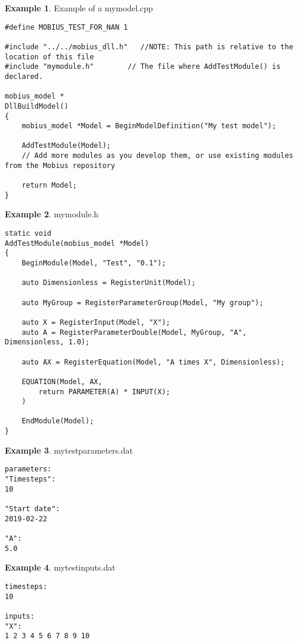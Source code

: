\documentclass[11pt]{article}
\theoremstyle{definition}
\newtheorem{myexample}{Example}
\newenvironment{example}%
  {\begin{lrbox}{\examplebox}%
   \begin{minipage}{\dimexpr\linewidth-2\fboxsep}
   \begin{myexample}}%
  {\end{myexample}%
   \end{minipage}%
   \end{lrbox}%
   \begin{trivlist}
     \item[]\colorbox{silver}{\usebox\examplebox}
   \end{trivlist}}
\begin{document}
\begin{example}\label{ex:examplemain}
Example of a mymodel.cpp
\begin{lstlisting}[style=mycpp]
#define MOBIUS_TEST_FOR_NAN 1

#include "../../mobius_dll.h"   //NOTE: This path is relative to the location of this file
#include "mymodule.h"        // The file where AddTestModule() is declared.

mobius_model *
DllBuildModel()
{
	mobius_model *Model = BeginModelDefinition("My test model");
	
	AddTestModule(Model);
	// Add more modules as you develop them, or use existing modules from the Mobius repository
	
	return Model;
}

\end{lstlisting}
\end{example}

\begin{example}
mymodule.h
\begin{lstlisting}[style=mycpp]
static void
AddTestModule(mobius_model *Model)
{
	BeginModule(Model, "Test", "0.1");

	auto Dimensionless = RegisterUnit(Model);

	auto MyGroup = RegisterParameterGroup(Model, "My group");

	auto X = RegisterInput(Model, "X");
	auto A = RegisterParameterDouble(Model, MyGroup, "A", Dimensionless, 1.0);

	auto AX = RegisterEquation(Model, "A times X", Dimensionless);

	EQUATION(Model, AX,
		return PARAMETER(A) * INPUT(X);
	)

	EndModule(Model);
}
\end{lstlisting}
\end{example}

\begin{example}
mytestparameters.dat
\begin{lstlisting}[style=textstyle]
parameters:
"Timesteps":
10

"Start date":
2019-02-22

"A":
5.0
\end{lstlisting}
\end{example}

\begin{example}
mytestinputs.dat
\begin{lstlisting}[style=textstyle]
timesteps:
10

inputs:
"X":
1 2 3 4 5 6 7 8 9 10
\end{lstlisting}
\end{example}
\end{document}
